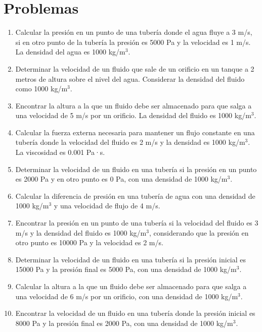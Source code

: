 \documentclass[../main]{subfiles}
\begin{document}
\section{Problemas}

\begin{enumerate}
    \item Calcular la presión en un punto de una tubería donde el agua fluye a 3 m/s, si en otro punto de la tubería la presión es 5000 Pa y la velocidad es 1 m/s. La densidad del agua es 1000 kg/m$^3$.
    \item Determinar la velocidad de un fluido que sale de un orificio en un tanque a 2 metros de altura sobre el nivel del agua. Considerar la densidad del fluido como 1000 kg/m$^3$.
    \item Encontrar la altura a la que un fluido debe ser almacenado para que salga a una velocidad de 5 m/s por un orificio. La densidad del fluido es 1000 kg/m$^3$.
    \item Calcular la fuerza externa necesaria para mantener un flujo constante en una tubería donde la velocidad del fluido es 2 m/s y la densidad es 1000 kg/m$^3$. La viscosidad es 0.001 Pa·s.
    \item Determinar la velocidad de un fluido en una tubería si la presión en un punto es 2000 Pa y en otro punto es 0 Pa, con una densidad de 1000 kg/m$^3$.
    \item Calcular la diferencia de presión en una tubería de agua con una densidad de 1000 kg/m$^3$ y una velocidad de flujo de 4 m/s.
    \item Encontrar la presión en un punto de una tubería si la velocidad del fluido es 3 m/s y la densidad del fluido es 1000 kg/m$^3$, considerando que la presión en otro punto es 10000 Pa y la velocidad es 2 m/s.
    \item Determinar la velocidad de un fluido en una tubería si la presión inicial es 15000 Pa y la presión final es 5000 Pa, con una densidad de 1000 kg/m$^3$.
    \item Calcular la altura a la que un fluido debe ser almacenado para que salga a una velocidad de 6 m/s por un orificio, con una densidad de 1000 kg/m$^3$.
    \item Encontrar la velocidad de un fluido en una tubería donde la presión inicial es 8000 Pa y la presión final es 2000 Pa, con una densidad de 1000 kg/m$^3$.
\end{enumerate}
\end{document}
